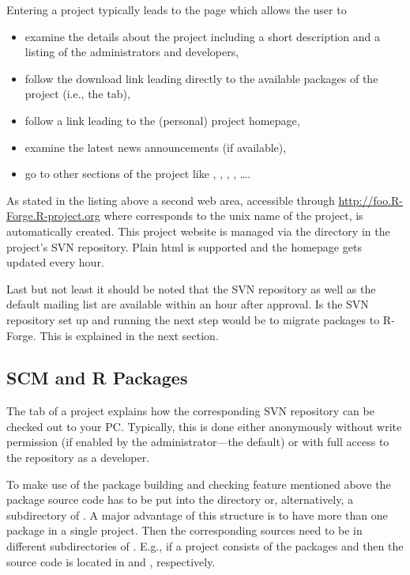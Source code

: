 Entering a project typically leads to the 
page which allows the user to

\begin{itemize}
\item examine the details about the project including a short
  description and a listing of the administrators and developers,
\item follow the download link leading directly to the available packages
  of the project (i.e., the  tab),
\item follow a link leading to the (personal) project homepage,
\item examine the latest news announcements (if available),
\item go to other sections of the project like
  , ,
   , , \ldots{}.
\end{itemize}

As stated in the listing above a second web area, accessible 
through \url{http://foo.R-Forge.R-project.org} where 
corresponds to the unix name of the project, is automatically
created. This project website is managed via the  directory
in the project's SVN repository. Plain html 
is supported and the homepage gets updated every hour.

Last but not least it should be noted that the SVN repository as well
as the default mailing list are available within an hour after
approval. Is the SVN repository set up and running the next step would
be to migrate packages to R-Forge. This is explained in the next
section.

\subsection{SCM and R Packages}

The  tab of a project explains how the corresponding SVN
repository can be checked out to your PC. Typically, this is done either
anonymously without write permission (if enabled by the
administrator---the default)
or with full access to the repository as a developer. 

To make use of the package building and checking feature mentioned
above the package source code has to be put into the 
directory or, alternatively, a 
subdirectory of . A major advantage of this structure is to
have more than one package in a single project. Then the corresponding
sources need to be in different subdirectories of . E.g., if
a project consists of the packages  and  then the
source code is located in  and ,
respectively.



